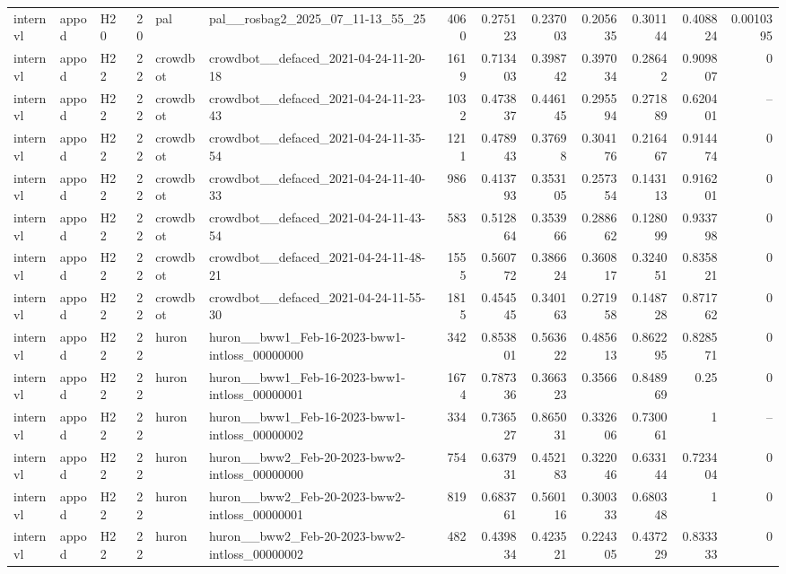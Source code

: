 \begin{longtable}{lllrllrrrrrrr}
internvl & appod & H20 & 20 & pal & pal\_\_rosbag2\_2025\_07\_11-13\_55\_25 & 4060 & 0.275123 & 0.237003 & 0.205635 & 0.301144 & 0.408824 & 0.0010395 \\
internvl & appod & H22 & 22 & crowdbot & crowdbot\_\_defaced\_2021-04-24-11-20-18 & 1619 & 0.713403 & 0.398742 & 0.397034 & 0.28642 & 0.909807 & 0 \\
internvl & appod & H22 & 22 & crowdbot & crowdbot\_\_defaced\_2021-04-24-11-23-43 & 1032 & 0.473837 & 0.446145 & 0.295594 & 0.271889 & 0.620401 & -- \\
internvl & appod & H22 & 22 & crowdbot & crowdbot\_\_defaced\_2021-04-24-11-35-54 & 1211 & 0.478943 & 0.37698 & 0.304176 & 0.216467 & 0.914474 & 0 \\
internvl & appod & H22 & 22 & crowdbot & crowdbot\_\_defaced\_2021-04-24-11-40-33 & 986 & 0.413793 & 0.353105 & 0.257354 & 0.143113 & 0.916201 & 0 \\
internvl & appod & H22 & 22 & crowdbot & crowdbot\_\_defaced\_2021-04-24-11-43-54 & 583 & 0.512864 & 0.353966 & 0.288662 & 0.128099 & 0.933798 & 0 \\
internvl & appod & H22 & 22 & crowdbot & crowdbot\_\_defaced\_2021-04-24-11-48-21 & 1555 & 0.560772 & 0.386624 & 0.360817 & 0.324051 & 0.835821 & 0 \\
internvl & appod & H22 & 22 & crowdbot & crowdbot\_\_defaced\_2021-04-24-11-55-30 & 1815 & 0.454545 & 0.340163 & 0.271958 & 0.148728 & 0.871762 & 0 \\
internvl & appod & H22 & 22 & huron & huron\_\_bww1\_Feb-16-2023-bww1-intloss\_00000000 & 342 & 0.853801 & 0.563622 & 0.485613 & 0.862295 & 0.828571 & 0 \\
internvl & appod & H22 & 22 & huron & huron\_\_bww1\_Feb-16-2023-bww1-intloss\_00000001 & 1674 & 0.787336 & 0.366323 & 0.3566 & 0.848969 & 0.25 & 0 \\
internvl & appod & H22 & 22 & huron & huron\_\_bww1\_Feb-16-2023-bww1-intloss\_00000002 & 334 & 0.736527 & 0.865031 & 0.332606 & 0.730061 & 1 & -- \\
internvl & appod & H22 & 22 & huron & huron\_\_bww2\_Feb-20-2023-bww2-intloss\_00000000 & 754 & 0.637931 & 0.452183 & 0.322046 & 0.633144 & 0.723404 & 0 \\
internvl & appod & H22 & 22 & huron & huron\_\_bww2\_Feb-20-2023-bww2-intloss\_00000001 & 819 & 0.683761 & 0.560116 & 0.300333 & 0.680348 & 1 & 0 \\
internvl & appod & H22 & 22 & huron & huron\_\_bww2\_Feb-20-2023-bww2-intloss\_00000002 & 482 & 0.439834 & 0.423521 & 0.224305 & 0.437229 & 0.833333 & 0 \\

\end{longtable}
